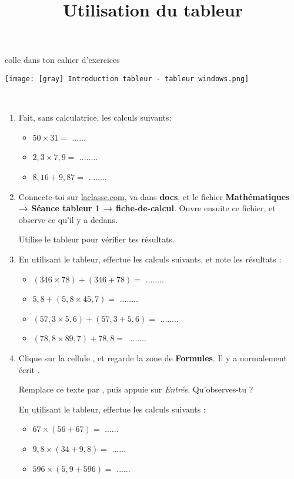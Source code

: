 \documentclass[a4paper,11pt]{article}
\title{Utilisation du tableur}
\author{}
\date{}
\makeatletter
\renewcommand{\maketitle}{%
{\scriptsize colle dans ton cahier d'exercices}
	\begin{center}
		\LARGE
		\uline{\@title}
		\vspace{0.5em}
	\end{center}
}
\makeatother
\begin{document}
\maketitle

\begin{center}
	\texttt{[image: [gray] Introduction tableur - tableur windows.png]}
\end{center}

\begin{exercice}\
	\begin{enumerate}
		\item Fait, sans calculatrice, les calculs suivants:
		      \begin{itemize}
			      \item $50 × 31 = $ ...... %
			      \item $2{,}3 × 7{,}9 = $ ........ %
			      \item $8{,}16 + 9{,}87 = $ ........ %
		      \end{itemize}
		\item Connecte-toi sur \url{laclasse.com}, va dans  \textbf{docs}, et  le fichier \textbf{Mathématiques → Séance tableur 1 → fiche-de-calcul}. Ouvre ensuite ce fichier, et observe ce qu'il y a dedans. \vspace{1em}

		      Utilise le tableur pour vérifier tes résultats.
		\item En utilisant le tableur, effectue les calculs suivants, et note les résultats :
		      \begin{itemize}
			      \item $(346 × 78) + (346 + 78) = $ ........
			      \item $5{,}8 + (5{,}8 × 45{,}7) = $ ........
			      \item $(57{,}3 × 5{,}6) + (57{,}3 + 5{,}6) = $ ........
			      \item $(78{,}8 × 89{,}7) + 78{,}8 = $ ........
		      \end{itemize}
		\item Clique sur la cellule , et regarde la zone de \textbf{Formules}. Il y a normalement écrit .

		      Remplace ce texte par , puis appuie sur \textit{Entrée}. Qu'observes-tu ?

		      En utilisant le tableur, effectue les calculs suivants :
		      \begin{itemize}
			      \item $67 × (56 + 67) = $ ......

			      \item $9{,}8 × (34 + 9{,}8) = $ ......

			      \item $596 × (5{,}9 + 596) = $ ......
		      \end{itemize}
	\end{enumerate}
\end{exercice}
\end{document}
